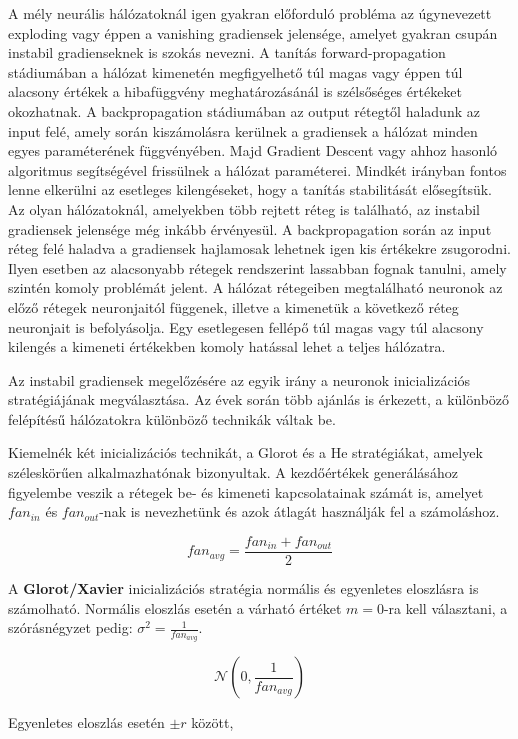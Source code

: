 A mély neurális hálózatoknál igen gyakran előforduló probléma az úgynevezett exploding vagy éppen a vanishing gradiensek jelensége, amelyet gyakran csupán instabil gradienseknek is szokás nevezni.
A tanítás forward-propagation stádiumában a hálózat kimenetén megfigyelhető túl magas vagy éppen túl alacsony értékek a hibafüggvény meghatározásánál is szélsőséges értékeket okozhatnak.
A backpropagation stádiumában az output rétegtől haladunk az input felé, amely során kiszámolásra kerülnek a gradiensek a hálózat minden egyes paraméterének függvényében. Majd Gradient Descent vagy ahhoz hasonló algoritmus segítségével frissülnek a hálózat paraméterei. Mindkét irányban fontos lenne elkerülni az esetleges kilengéseket, hogy a tanítás stabilitását elősegítsük.
Az olyan hálózatoknál, amelyekben több rejtett réteg is található, az instabil gradiensek jelensége még inkább érvényesül. A backpropagation során az input réteg felé haladva a gradiensek hajlamosak lehetnek igen kis értékekre zsugorodni. Ilyen esetben az alacsonyabb rétegek rendszerint lassabban fognak tanulni, amely szintén komoly problémát jelent.
A hálózat rétegeiben megtalálható neuronok az előző rétegek neuronjaitól függenek, illetve a kimenetük a következő réteg neuronjait is befolyásolja. Egy esetlegesen fellépő túl magas vagy túl alacsony kilengés a kimeneti értékekben komoly hatással lehet a teljes hálózatra.

Az instabil gradiensek megelőzésére az egyik irány a neuronok inicializációs stratégiájának megválasztása.
Az évek során több ajánlás is érkezett, a különböző felépítésű hálózatokra különböző technikák váltak be.

Kiemelnék két inicializációs technikát, a Glorot \cite{glorot2010understanding} és a He \cite{he2015delving} stratégiákat, amelyek széleskörűen alkalmazhatónak bizonyultak.
A kezdőértékek generálásához figyelembe veszik a rétegek be- és kimeneti kapcsolatainak számát is, amelyet $fan_{in}$ és $fan_{out}$-nak is nevezhetünk és azok átlagát használják fel a számoláshoz.

$$fan_{avg} = \frac{fan_{in} + fan_{out}}{2}$$

A \textbf{Glorot/Xavier} inicializációs stratégia normális és egyenletes eloszlásra is számolható.
Normális eloszlás esetén a várható értéket $m = 0$-ra kell választani, a szórásnégyzet pedig: $ \sigma^2 = \frac{1}{fan_{avg}} $.

$$ \mathcal{N}(0, \frac{1}{fan_{avg}}) $$

Egyenletes eloszlás esetén $\pm r$ között,

